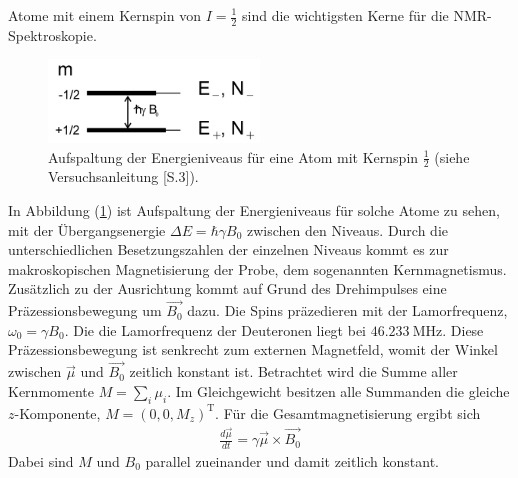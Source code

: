 Atome mit einem Kernspin von $I=\frac{1}{2}$ sind die wichtigsten Kerne für die NMR-Spektroskopie.
\begin{figure}[hbtp]
	\centering
	\includegraphics[width=0.5\textwidth]{Plots/energieniveaus.png}
	\caption{Aufspaltung der Energieniveaus f\"{u}r eine Atom mit Kernspin $\frac{1}{2}$ (siehe Versuchsanleitung \cite{Anleitung}[S.3]).}
	\label{Energieniveaus}
\end{figure}
In Abbildung (\ref{Energieniveaus}) ist Aufspaltung der Energieniveaus f\"{u}r solche Atome zu sehen, mit der \"{U}bergangsenergie $\Delta E = \hbar \gamma B_0$ zwischen den Niveaus.
Durch die unterschiedlichen Besetzungszahlen der einzelnen Niveaus kommt es zur makroskopischen Magnetisierung der Probe, dem sogenannten Kernmagnetismus.
Zus\"{a}tzlich zu der Aus{\-}richt{\-}ung kommt auf Grund des Drehimpulses eine Pr\"{a}zessionsbewegung um $\overrightarrow{B_0}$ dazu.
Die Spins pr\"{a}zedieren mit der Lamorfrequenz, $\omega_0 = \gamma B_0$.
Die die Lamorfrequenz der Deuteronen liegt bei $\SI{46,233}{\mega\hertz}$.
Diese Pr\"{a}zessionsbewegung ist senkrecht zum externen Magnetfeld, womit der Winkel zwischen $\overrightarrow{\mu}$ und $\overrightarrow{B_0}$ zeitlich konstant ist.
Betrachtet wird die Summe aller Kernmomente $M = \sum_i \mu_i$.
Im Gleichgewicht besitzen alle Summanden die gleiche $z$-Komponente, $M = (0,0,M_z)^{\text{T}}$.
F\"{u}r die Gesamtmagnetisierung ergibt sich
\begin{align*}
	\frac{d \vec{\mu}}{d t} = \gamma \vec{\mu} \times \vec{B_0}
\end{align*}
Dabei sind $M$ und $B_0$ parallel zueinander und damit zeitlich konstant.

